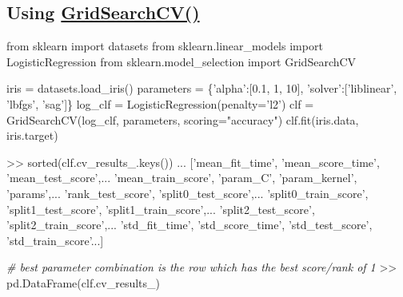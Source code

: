\documentclass[11pt]{article}
\newenvironment{Shaded}{}{}
\newcommand{\DecValTok}[1]{\textcolor[rgb]{0.25,0.63,0.44}{{#1}}}
\newcommand{\FloatTok}[1]{\textcolor[rgb]{0.25,0.63,0.44}{{#1}}}
\newcommand{\StringTok}[1]{\textcolor[rgb]{0.25,0.44,0.63}{{#1}}}
\newcommand{\CommentTok}[1]{\textcolor[rgb]{0.38,0.63,0.69}{\textit{{#1}}}}
\newcommand{\NormalTok}[1]{{#1}}
\newcommand{\ImportTok}[1]{{#1}}
\newcommand{\OperatorTok}[1]{\textcolor[rgb]{0.40,0.40,0.40}{{#1}}}
\newcommand{\BuiltInTok}[1]{{#1}}
\begin{document}
    \hypertarget{using-gridsearchcv}{%
\subsection{\texorpdfstring{Using
\href{http://scikit-learn.org/stable/modules/generated/sklearn.model_selection.GridSearchCV.html}{GridSearchCV()}}{Using GridSearchCV()}}\label{using-gridsearchcv}}

\begin{Shaded}
\begin{Highlighting}[]
\ImportTok{from}\NormalTok{ sklearn }\ImportTok{import}\NormalTok{ datasets}
\ImportTok{from}\NormalTok{ sklearn.linear_models }\ImportTok{import}\NormalTok{ LogisticRegression}
\ImportTok{from}\NormalTok{ sklearn.model_selection }\ImportTok{import}\NormalTok{ GridSearchCV}

\NormalTok{iris }\OperatorTok{=}\NormalTok{ datasets.load_iris()}
\NormalTok{parameters }\OperatorTok{=}\NormalTok{ \{}\StringTok{'alpha'}\NormalTok{:[}\FloatTok{0.1}\NormalTok{, }\DecValTok{1}\NormalTok{, }\DecValTok{10}\NormalTok{], }\StringTok{'solver'}\NormalTok{:[}\StringTok{'liblinear'}\NormalTok{, }\StringTok{'lbfgs'}\NormalTok{, }\StringTok{'sag'}\NormalTok{]\}}
\NormalTok{log_clf }\OperatorTok{=}\NormalTok{ LogisticRegression(penalty}\OperatorTok{=}\StringTok{'l2'}\NormalTok{)}
\NormalTok{clf }\OperatorTok{=}\NormalTok{ GridSearchCV(log_clf, parameters, scoring}\OperatorTok{=}\StringTok{"accuracy"}\NormalTok{)}
\NormalTok{clf.fit(iris.data, iris.target)}

\OperatorTok{>>} \BuiltInTok{sorted}\NormalTok{(clf.cv_results_.keys())}
\NormalTok{...                             }
\NormalTok{[}\StringTok{'mean_fit_time'}\NormalTok{, }\StringTok{'mean_score_time'}\NormalTok{, }\StringTok{'mean_test_score'}\NormalTok{,...}
 \StringTok{'mean_train_score'}\NormalTok{, }\StringTok{'param_C'}\NormalTok{, }\StringTok{'param_kernel'}\NormalTok{, }\StringTok{'params'}\NormalTok{,...}
 \StringTok{'rank_test_score'}\NormalTok{, }\StringTok{'split0_test_score'}\NormalTok{,...}
 \StringTok{'split0_train_score'}\NormalTok{, }\StringTok{'split1_test_score'}\NormalTok{, }\StringTok{'split1_train_score'}\NormalTok{,...}
 \StringTok{'split2_test_score'}\NormalTok{, }\StringTok{'split2_train_score'}\NormalTok{,...}
 \StringTok{'std_fit_time'}\NormalTok{, }\StringTok{'std_score_time'}\NormalTok{, }\StringTok{'std_test_score'}\NormalTok{, }\StringTok{'std_train_score'}\NormalTok{...]}
 
 \CommentTok{# best parameter combination is the row which has the best score/rank of 1}
\OperatorTok{>>}\NormalTok{ pd.DataFrame(clf.cv_results_)}
\end{Highlighting}
\end{Shaded}
\end{document}
